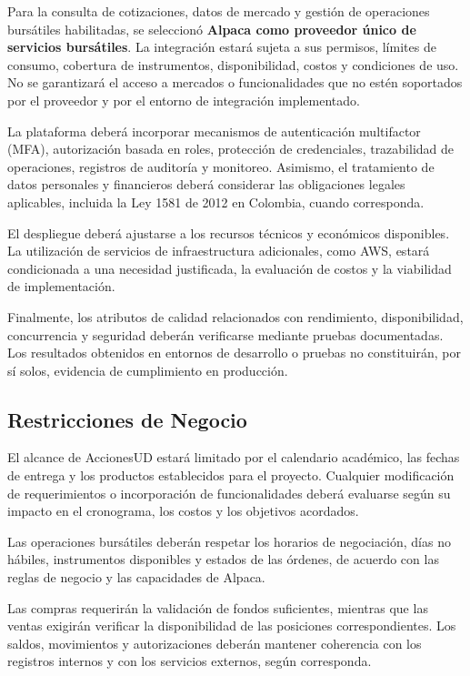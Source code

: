 \documentclass[11pt,a4paper,oneside]{article}
\begin{document}
Para la consulta de cotizaciones, datos de mercado y
gestión de operaciones bursátiles habilitadas, se
seleccionó \textbf{Alpaca como proveedor único de
servicios bursátiles}. La integración estará sujeta
a sus permisos, límites de consumo, cobertura de
instrumentos, disponibilidad, costos y condiciones
de uso. No se garantizará el acceso a mercados o
funcionalidades que no estén soportados por el proveedor
y por el entorno de integración implementado.

La plataforma deberá incorporar mecanismos de
autenticación multifactor (MFA), autorización basada
en roles, protección de credenciales, trazabilidad
de operaciones, registros de auditoría y monitoreo.
Asimismo, el tratamiento de datos personales y
financieros deberá considerar las obligaciones
legales aplicables, incluida la Ley 1581 de 2012
en Colombia, cuando corresponda.

El despliegue deberá ajustarse a los recursos técnicos
y económicos disponibles. La utilización de servicios
de infraestructura adicionales, como AWS, estará
condicionada a una necesidad justificada, la evaluación
de costos y la viabilidad de implementación.

Finalmente, los atributos de calidad relacionados
con rendimiento, disponibilidad, concurrencia y
seguridad deberán verificarse mediante pruebas
documentadas. Los resultados obtenidos en entornos
de desarrollo o pruebas no constituirán, por sí solos,
evidencia de cumplimiento en producción.


\subsection{Restricciones de Negocio}

El alcance de AccionesUD estará limitado por el
calendario académico, las fechas de entrega y los
productos establecidos para el proyecto. Cualquier
modificación de requerimientos o incorporación de
funcionalidades deberá evaluarse según su impacto
en el cronograma, los costos y los objetivos acordados.

Las operaciones bursátiles deberán respetar los
horarios de negociación, días no hábiles, instrumentos
disponibles y estados de las órdenes, de acuerdo con
las reglas de negocio y las capacidades de Alpaca.

Las compras requerirán la validación de fondos
suficientes, mientras que las ventas exigirán
verificar la disponibilidad de las posiciones
correspondientes. Los saldos, movimientos y
autorizaciones deberán mantener coherencia con
los registros internos y con los servicios externos,
según corresponda.
\end{document}
